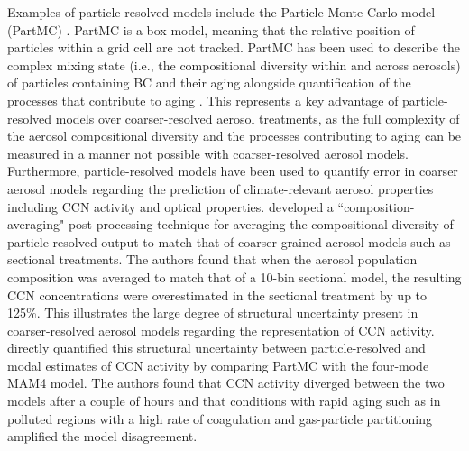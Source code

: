 Examples of particle-resolved models include the Particle Monte Carlo model (PartMC) \parencite{riemer_simulating_2009}. PartMC is a box model, meaning that the relative position of particles within a grid cell are not tracked. PartMC has been used to describe the complex mixing state (i.e., the compositional diversity within and across aerosols) of particles containing BC and their aging alongside quantification of the processes that contribute to aging \parencite{riemer_simulating_2009}. This represents a key advantage of particle-resolved models over coarser-resolved aerosol treatments, as the full complexity of the aerosol compositional diversity and the processes contributing to aging can be measured in a manner not possible with coarser-resolved aerosol models. Furthermore, particle-resolved models have been used to quantify error in coarser aerosol models regarding the prediction of climate-relevant aerosol properties including CCN activity and optical properties. \textcite{zaveri_particle-resolved_2010} developed a ``composition-averaging" post-processing technique for averaging the compositional diversity of particle-resolved output to match that of coarser-grained aerosol models such as sectional treatments. The authors found that when the aerosol population composition was averaged to match that of a 10-bin sectional model, the resulting CCN concentrations were overestimated in the sectional treatment by up to 125\%. This illustrates the large degree of structural uncertainty present in coarser-resolved aerosol models regarding the representation of CCN activity. \textcite{fierce_quantifying_2024} directly quantified this structural uncertainty between particle-resolved and modal estimates of CCN activity by comparing PartMC with the four-mode MAM4 model. The authors found that CCN activity diverged between the two models after a couple of hours and that conditions with rapid aging such as in polluted regions with a high rate of coagulation and gas-particle partitioning amplified the model disagreement. 

